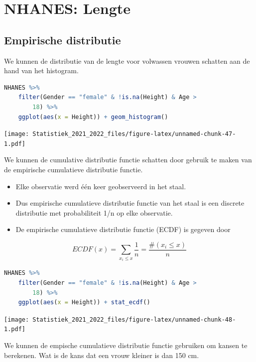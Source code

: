 \documentclass[
  12pt,dutch,coursenotes]{book}
\providecommand{\tightlist}{%
  \setlength{\itemsep}{0pt}\setlength{\parskip}{0pt}}
\theoremstyle{definition}
\theoremstyle{definition}
\theoremstyle{definition}
\theoremstyle{definition}
\theoremstyle{remark}
\begin{document}
\hypertarget{nhanes-lengte}{%
\section{NHANES: Lengte}\label{nhanes-lengte}}

\hypertarget{empirische-distributie}{%
\subsection{Empirische distributie}\label{empirische-distributie}}

We kunnen de distributie van de lengte voor volwassen vrouwen schatten aan de hand van het histogram.

\begin{lstlisting}[language=R]
NHANES %>%
    filter(Gender == "female" & !is.na(Height) & Age >
        18) %>%
    ggplot(aes(x = Height)) + geom_histogram()
\end{lstlisting}

\texttt{[image: Statistiek\_2021\_2022\_files/figure-latex/unnamed-chunk-47-1.pdf]}

We kunnen de cumulative distributie functie schatten door gebruik te maken van de empirische cumulatieve distributie functie.

\begin{itemize}
\tightlist
\item
  Elke observatie werd één keer geobserveerd in het staal.
\item
  Dus empirische cumulatieve distributie functie van het staal is een discrete distributie met probabiliteit 1/n op elke observatie.
\item
  De empirische cumulatieve distributie functie (ECDF) is gegeven door
\end{itemize}

\[ECDF(x) = \sum\limits_{x_i \leq x} \frac{1}{n} = \frac{\# (x_i \leq x)}{n}\]

\begin{lstlisting}[language=R]
NHANES %>%
    filter(Gender == "female" & !is.na(Height) & Age >
        18) %>%
    ggplot(aes(x = Height)) + stat_ecdf()
\end{lstlisting}

\texttt{[image: Statistiek\_2021\_2022\_files/figure-latex/unnamed-chunk-48-1.pdf]}

We kunnen de empische cumulatieve distributie functie gebruiken om kansen te berekenen.
Wat is de kans dat een vrouw kleiner is dan 150 cm.
\end{document}
